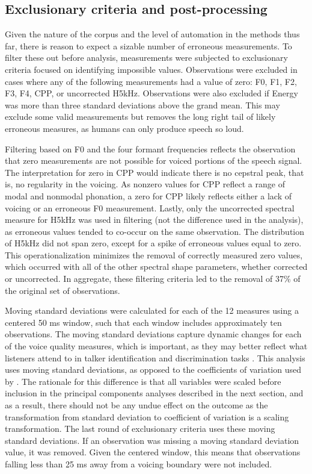 \subsection{Exclusionary criteria and post-processing}\label{ch3:sec:exclusions}

Given the nature of the corpus and the level of automation in the methods thus far, there is reason to expect a sizable number of erroneous measurements. To filter these out before analysis, measurements were subjected to exclusionary criteria focused on identifying impossible values. Observations were excluded in cases where any of the following measurements had a value of zero: F0, F1, F2, F3, F4, CPP, or uncorrected H5kHz. Observations were also excluded if Energy was more than three standard deviations above the grand mean. This may exclude some valid measurements but removes the long right tail of likely erroneous measures, as humans can only produce speech so loud. 

Filtering based on F0 and the four formant frequencies reflects the observation that zero measurements are not possible for voiced portions of the speech signal. The interpretation for zero in CPP would indicate there is no cepstral peak, that is, no regularity in the voicing. As nonzero values for CPP reflect a range of modal and nonmodal phonation, a zero for CPP likely reflects either a lack of voicing or an erroneous F0 measurement. Lastly, only the uncorrected spectral measure for H5kHz was used in filtering (not the difference used in the analysis), as erroneous values tended to co-occur on the same observation. The distribution of H5kHz did not span zero, except for a spike of erroneous values equal to zero. This operationalization minimizes the removal of correctly measured zero values, which occurred with all of the other spectral shape parameters, whether corrected or uncorrected. In aggregate, these filtering criteria led to the removal of 37\% of the original set of observations.

Moving standard deviations were calculated for each of the 12 measures using a centered 50 ms window, such that each window includes approximately ten observations. The moving standard deviations capture dynamic changes for each of the voice quality measures, which is important, as they may better reflect what listeners attend to in talker identification and discrimination tasks \citep{lee_2019_acoustic}. This analysis uses moving standard deviations, as opposed to the coefficients of variation used by \citet{lee_2019_acoustic}. The rationale for this difference is that all variables were scaled before inclusion in the principal components analyses described in the next section, and as a result, there should not be any undue effect on the outcome as the transformation from standard deviation to coefficient of variation is a scaling transformation. The last round of exclusionary criteria uses these moving standard deviations. If an observation was missing a moving standard deviation value, it was removed. Given the centered window, this means that observations falling less than 25 ms away from a voicing boundary were not included. 

